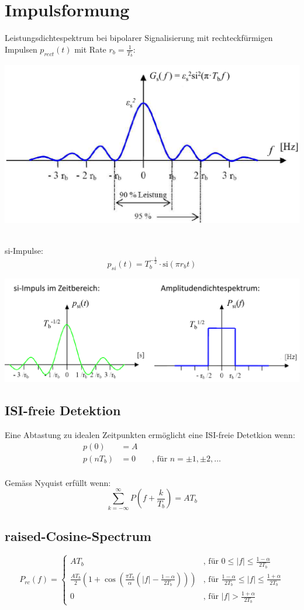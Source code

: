 \chapter{Impulsformung}
Leistungsdichtespektrum bei bipolarer Signalisierung mit rechteckfürmigen
Impulsen $p_{rect}(t)$ mit Rate $r_b=\frac{1}{T_b}$:

\begin{center}
	\includegraphics[width=.9\textwidth]{../fig/grect}
\end{center}
~\\
si-Impulse:
\[
	p_{si}(t) = T_b^{-\frac{1}{2}} \cdot \textrm{si}(\pi r_b t)
\]
\begin{center}
	\includegraphics[width=.9\textwidth]{../fig/si}
\end{center}

\section{ISI-freie Detektion}
Eine Abtastung zu idealen Zeitpunkten ermöglicht eine ISI-freie Detetkion wenn:
\[\begin{aligned}
	p(0) &= A\\
	p(nT_b) &= 0 \qquad \textrm{, für } n=\pm1,\pm2,\ldots	
\end{aligned}\]
~\\Gemäss Nyquist erfüllt wenn:
\[
	\sum_{k=-\infty}^{\infty} P\left(f+\frac{k}{T_b}\right) = AT_b
\]

\section{raised-Cosine-Spectrum}
\[
	P_{rc}(f) = \left\lbrace
	\begin{matrix}
		AT_b & \textrm{, für } 0 \leq |f| \leq \frac{1-\alpha}{2T_b} \\
		\frac{AT_b}{2}\left(1 + \cos\left( \frac{\pi T_b}{\alpha}
			\left(|f|-\frac{1-\alpha}{2T_b} \right)\right)\right)
			& \textrm{, für } \frac{1-\alpha}{2T_b} \leq |f| \leq \frac{1+\alpha}{2T_b} \\
			0 & \textrm{, für } |f| > \frac{1+\alpha}{2T_b}
	\end{matrix}
	\right.
\]

